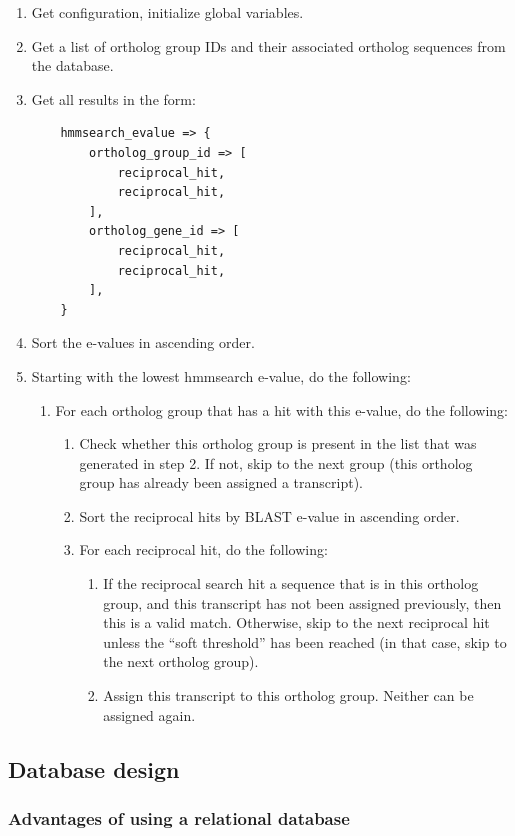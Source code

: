 \begin{enumerate}
	\item Get configuration, initialize global variables.
	\item Get a list of ortholog group IDs and their associated ortholog sequences
		from the database.
	\item Get all results in the form:
	\begin{lstlisting}
	hmmsearch_evalue => {
		ortholog_group_id => [
			reciprocal_hit,
			reciprocal_hit,
		],
		ortholog_gene_id => [
			reciprocal_hit,
			reciprocal_hit,
		],
	}
	\end{lstlisting}
	\item Sort the e-values in ascending order.
	\item Starting with the lowest hmmsearch e-value, do the following:
	\begin{enumerate}
		\item For each ortholog group that has a hit with this e-value, do the following:
		\begin{enumerate}
			\item Check whether this ortholog group is present in the list that was
				generated in step 2. If not, skip to the next group (this ortholog group
				has already been assigned a transcript).
			\item Sort the reciprocal hits by BLAST e-value in ascending order.
			\item For each reciprocal hit, do the following:
			\begin{enumerate}
				\item If the reciprocal search hit a sequence that is in this ortholog
					group, and this transcript has not been assigned previously, then this
					is a valid match. Otherwise, skip to the next reciprocal hit unless
					the ``soft threshold'' has been reached (in that case, skip to the
					next ortholog group).
				\item Assign this transcript to this ortholog group. Neither can be
					assigned again.
			\end{enumerate}
		\end{enumerate}
	\end{enumerate}
\end{enumerate}

\subsection{Database design}

\subsubsection{Advantages of using a relational database}


